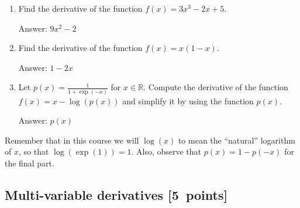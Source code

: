 \documentclass{article}
\newenvironment{answer}{\par\begingroup\color{gre}Answer: }{\endgroup}
\newcommand\pts[1]{\textcolor{pointscolour}{[#1~points]}}
\def\R{\mathbb{R}}
\begin{document}
  \begin{enumerate}
  \item Find the derivative of the function $f(x) = 3x^3 -2x + 5$.
  \begin{answer}
    $9x^2 - 2$
  \end{answer}
  \item Find the derivative of the function $f(x) = x(1-x)$.
  \begin{answer}
    $1-2x$
  \end{answer}
  \item Let $p(x) = \frac{1}{1+\exp(-x)}$ for $x \in \R$. Compute the derivative of the function $f(x) = x-\log(p(x))$ and simplify it by using the function $p(x)$.
  \begin{answer}
    $p(x)$
  \end{answer}
  \end{enumerate}
  Remember that in this course we will $\log(x)$ to mean the ``natural'' logarithm of $x$, so that $\log(\exp(1)) = 1$. Also, observe that $p(x) = 1-p(-x)$ for the final part.

  \subsection{Multi-variable derivatives \pts{5}}
  \label{sub.multi.var}
\end{document}
